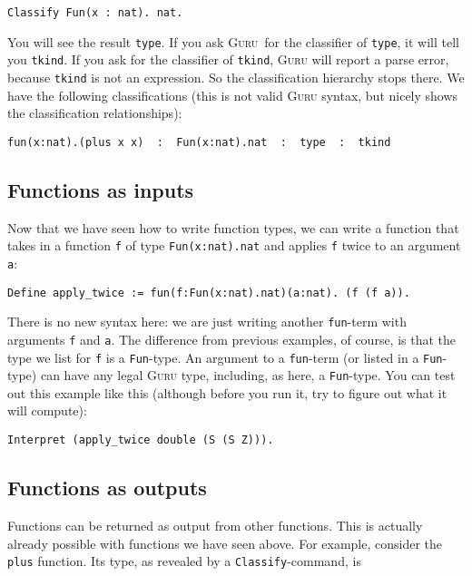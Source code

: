 \documentclass{book}[12pt]
\newcommand{\guru}[0]{\textsc{Guru}\xspace}
\begin{document}
\begin{verbatim}
Classify Fun(x : nat). nat.
\end{verbatim}

\noindent You will see the result \texttt{type}.  If you ask \guru\
for the classifier of \texttt{type}, it will tell you \texttt{tkind}.
If you ask for the classifier of \texttt{tkind}, \guru will report a
parse error, because \texttt{tkind} is not an expression.  So the
classification hierarchy stops there.  We have the following
classifications (this is not valid \guru syntax, but nicely shows the
classification relationships):

\begin{verbatim}
fun(x:nat).(plus x x)  :  Fun(x:nat).nat  :  type  :  tkind
\end{verbatim} 

\subsection{Functions as inputs}

Now that we have seen how to write function types, we can write a
function that takes in a function \texttt{f} of type
\texttt{Fun(x:nat).nat} and applies \texttt{f} twice to an argument
\texttt{a}:

\begin{verbatim}
Define apply_twice := fun(f:Fun(x:nat).nat)(a:nat). (f (f a)).
\end{verbatim}

\noindent There is no new syntax here: we are just writing another
\texttt{fun}-term with arguments \texttt{f} and \texttt{a}.  The
difference from previous examples, of course, is that the type we list
for \texttt{f} is a \texttt{Fun}-type.  An argument to a
\texttt{fun}-term (or listed in a \texttt{Fun}-type) can have any
legal \guru type, including, as here, a \texttt{Fun}-type. You can
test out this example like this (although before you run it, try to
figure out what it will compute):

\begin{verbatim}
Interpret (apply_twice double (S (S Z))).
\end{verbatim}

\subsection{Functions as outputs}

Functions can be returned as output from other functions.  This is
actually already possible with functions we have seen above.  For
example, consider the \texttt{plus} function.  Its type, as revealed
by a \texttt{Classify}-command, is 
\end{document}
